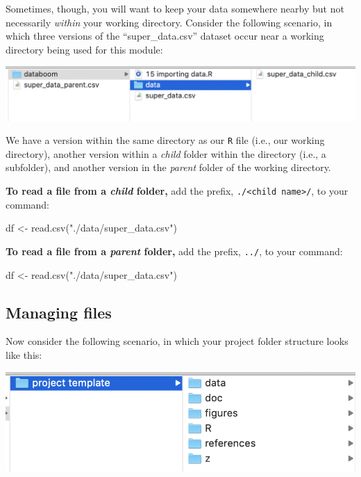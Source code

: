 \documentclass[
]{book}
\newenvironment{Shaded}{\begin{snugshade}}{\end{snugshade}}
\newcommand{\FunctionTok}[1]{\textcolor[rgb]{0.00,0.00,0.00}{#1}}
\newcommand{\NormalTok}[1]{#1}
\newcommand{\OtherTok}[1]{\textcolor[rgb]{0.56,0.35,0.01}{#1}}
\newcommand{\StringTok}[1]{\textcolor[rgb]{0.31,0.60,0.02}{#1}}
\begin{document}
Sometimes, though, you will want to keep your data somewhere nearby but not necessarily \emph{within} your working directory. Consider the following scenario, in which three versions of the ``super\_data.csv'' dataset occur near a working directory being used for this module:

\includegraphics{img/csv_wd.png}

We have a version within the same directory as our \texttt{R} file (i.e., our working directory), another version within a \emph{child} folder within the directory (i.e., a subfolder), and another version in the \emph{parent} folder of the working directory.

\textbf{To read a file from a \emph{child} folder,} add the prefix, \texttt{./\textless{}child\ name\textgreater{}/}, to your command:

\begin{Shaded}
\begin{Highlighting}[]
\NormalTok{df }\OtherTok{\textless{}{-}} \FunctionTok{read.csv}\NormalTok{(}\StringTok{"./data/super\_data.csv"}\NormalTok{)}
\end{Highlighting}
\end{Shaded}

\textbf{To read a file from a \emph{parent} folder,} add the prefix, \texttt{../}, to your command:

\begin{Shaded}
\begin{Highlighting}[]
\NormalTok{df }\OtherTok{\textless{}{-}} \FunctionTok{read.csv}\NormalTok{(}\StringTok{"./data/super\_data.csv"}\NormalTok{)}
\end{Highlighting}
\end{Shaded}

\hypertarget{managing-files}{%
\subsection*{Managing files}\label{managing-files}}

Now consider the following scenario, in which your project folder structure looks like this:

\includegraphics{img/project_template.png}
\end{document}
